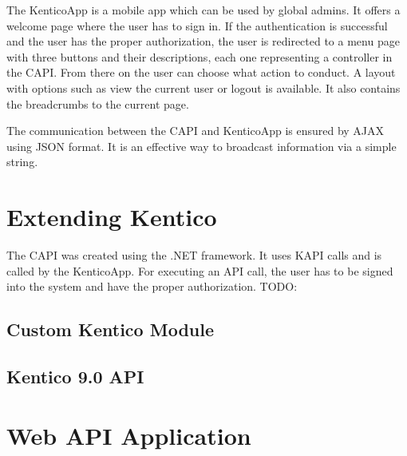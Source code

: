 The KenticoApp is a mobile app which can be used by global admins. It offers a welcome page where the user has to sign in. If the authentication is successful and the user has the proper authorization, the user is redirected to a menu page with three buttons and their descriptions, each one representing a controller in the CAPI. From there on the user can choose what action to conduct. A layout with options such as view the current user or logout is available. It also contains the breadcrumbs to the current page. 

The communication between the CAPI and KenticoApp is ensured by AJAX using JSON format. It is an effective way to broadcast information via a simple string.

\section{Extending Kentico} \label{implExtendingKentico}
The CAPI was created using the .NET framework. It uses KAPI calls and is called by the KenticoApp. For executing an API call, the user has to be signed into the system and have the proper authorization. 
TODO: 
\subsection{Custom Kentico Module}

\subsection{Kentico 9.0 API}

\section{Web API Application}
